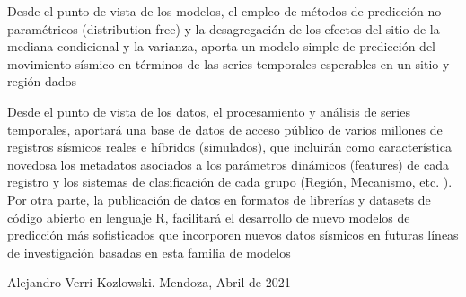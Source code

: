 \documentclass[
]{krantz}
\begin{document}
Desde el punto de vista de los modelos, el empleo de métodos de predicción no-paramétricos (distribution-free) y la desagregación de los efectos del sitio de la mediana condicional y la varianza, aporta un modelo simple de predicción del movimiento sísmico en términos de las series temporales esperables en un sitio y región dados

Desde el punto de vista de los datos, el procesamiento y análisis de series temporales, aportará una base de datos de acceso público de varios millones de registros sísmicos reales e híbridos (simulados), que incluirán como característica novedosa los metadatos asociados a los parámetros dinámicos (features) de cada registro y los sistemas de clasificación de cada grupo (Región, Mecanismo, etc. ). Por otra parte, la publicación de datos en formatos de librerías y datasets de código abierto en lenguaje R, facilitará el desarrollo de nuevo modelos de predicción más sofisticados que incorporen nuevos datos sísmicos en futuras líneas de investigación basadas en esta familia de modelos

Alejandro Verri Kozlowski. Mendoza, Abril de 2021
\end{document}
